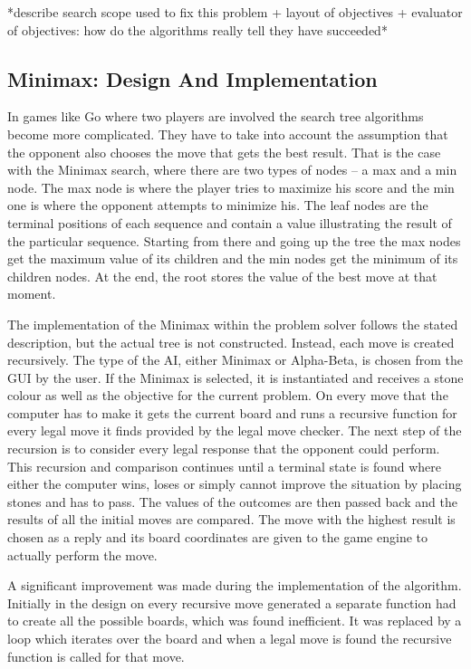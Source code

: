 \documentclass{l3proj}
\begin{document}
*describe search scope used to fix this problem + layout of objectives + evaluator of objectives: how do the algorithms really tell they have succeeded*

\subsection{Minimax: Design And Implementation}

In games like Go where two players are involved the search tree algorithms become more complicated. They have to take into account the assumption that the opponent also chooses the move that gets the best result. That is the case with the Minimax search, where there are two types of nodes – a max and a min node. The max node is where the player tries to maximize his score and the min one is where the opponent attempts to minimize his. The leaf nodes are the terminal positions of each sequence and contain a value illustrating the result of the particular sequence. Starting from there and going up the tree the max nodes get the maximum value of its children and the min nodes get the minimum of its children nodes. At the end, the root stores the value of the best move at that moment.  

The implementation of the Minimax within the problem solver follows the stated description, but the actual tree is not constructed. Instead, each move is created recursively. The type of the AI, either Minimax or Alpha-Beta, is chosen from the GUI by the user. If the Minimax is selected, it is instantiated and receives a stone colour as well as the objective for the current problem. On every move that the computer has to make it gets the current board and runs a recursive function for every legal move it finds provided by the legal move checker. The next step of the recursion is to consider every legal response that the opponent could perform. This recursion and comparison continues until a terminal state is found where either the computer wins, loses or simply cannot improve the situation by placing stones and has to pass. The values of the outcomes are then passed back and the results of all the initial moves are compared. The move with the highest result is chosen as a reply and its board coordinates are given to the game engine to actually perform the move.

A significant improvement was made during the implementation of the algorithm. Initially in the design on every recursive move generated a separate function had to create all the possible boards, which was found inefficient. It was replaced by a loop which iterates over the board and when a legal move is found the recursive function is called for that move.
\end{document}
